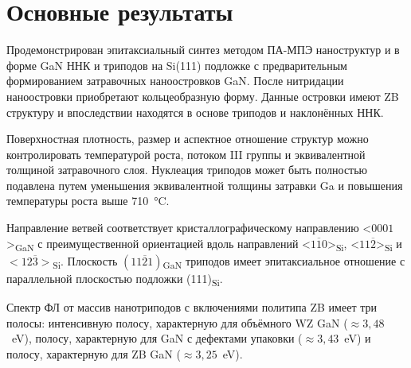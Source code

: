 \section{Основные результаты}\label{sec:ch3/sec7}

Продемонстрирован эпитаксиальный синтез методом ПА-МПЭ наноструктур и в форме
GaN ННК и триподов на Si(111) подложке с предварительным формированием
затравочных наноостровков GaN. После нитридации наноостровки приобретают
кольцеобразную форму. Данные островки имеют ZB структуру и впоследствии
находятся в основе триподов и наклонённых ННК.

Поверхностная плотность, размер и аспектное отношение структур можно
контролировать температурой роста, потоком III группы и эквивалентной толщиной
затравочного слоя. Нуклеация триподов может быть полностью подавлена путем
уменьшения эквивалентной толщины затравки Ga и повышения температуры роста выше
710~\si{\degreeCelsius}.

Направление ветвей соответствует кристаллографическому направлению
<\(0001\)>\textsubscript{GaN} с преимущественной ориентацией вдоль направлений
<\(1\overline{1}0\)>\textsubscript{Si}, <\(11\overline{2}\)>\textsubscript{Si}
и \(<12\overline{3}>\)\textsubscript{Si}. Плоскость
\((11\overline{2}1)\)\textsubscript{GaN} триподов имеет эпитаксиальное
отношение с параллельной плоскостью подложки (111)\textsubscript{Si}.

Спектр ФЛ от массив нанотриподов с включениями политипа ZB имеет три полосы:
интенсивную полосу, характерную для объёмного WZ GaN (\(\approx
3,48\)~\si{\electronvolt}), полосу, характерную для GaN с дефектами упаковки
(\(\approx 3,43\)~\si{\electronvolt}) и полосу, характерную для ZB GaN
(\(\approx 3,25\)~\si{\electronvolt}).

\FloatBarrier
